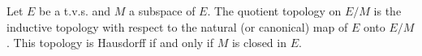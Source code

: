 Let $E$ be a t.v.s. and $M$ a subspace of $E$. The quotient topology on $E/M$ is the inductive topology with respect to the natural (or canonical) map of $E$ onto $E/M$. This topology is Hausdorff if and only if $M$ is closed in $E$.
